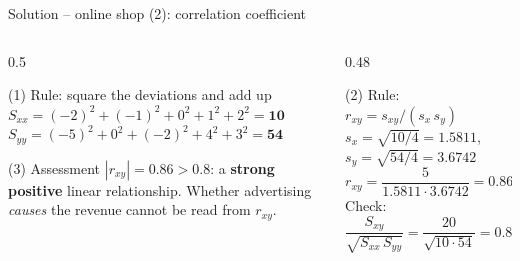 \documentclass[aspectratio=169,11pt]{beamer}
\newcommand{\minlineskip}{%
  \setlength{\lineskiplimit}{2pt}\setlength{\lineskip}{2pt}%
  \setlength{\normallineskiplimit}{2pt}\setlength{\normallineskip}{2pt}}
\begin{document}
\begin{frame}{Solution -- online shop (2): correlation coefficient}
  \begin{columns}[T]
    \begin{column}{0.5\textwidth}
      \small\minlineskip
      \begin{block}{(1) Rule: square the deviations and add up}
        $S_{xx} = (-2)^{2} + (-1)^{2} + 0^{2} + 1^{2} + 2^{2} = \mathbf{10}$\\[4pt]
        $S_{yy} = (-5)^{2} + 0^{2} + (-2)^{2} + 4^{2} + 3^{2} = \mathbf{54}$
      \end{block}
      \begin{exampleblock}{(3) Assessment}
        $|r_{xy}| = 0.86 > 0.8$: a \textbf{strong positive} linear
        relationship. Whether advertising \emph{causes} the revenue cannot be
        read from $r_{xy}$.
      \end{exampleblock}
    \end{column}
    \begin{column}{0.48\textwidth}
      \small\minlineskip
      \begin{block}{(2) Rule: $r_{xy} = s_{xy} / (s_x\,s_y)$}
        $s_x = \sqrt{10/4} = 1.5811$, \quad $s_y = \sqrt{54/4} = 3.6742$\\[3pt]
        $r_{xy} = \dfrac{5}{1.5811 \cdot 3.6742} = \mathbf{0.8607}$\\[3pt]
        Check: $\dfrac{S_{xy}}{\sqrt{S_{xx}\,S_{yy}}} = \dfrac{20}{\sqrt{10 \cdot 54}} = 0.8607$ \checkmark
      \end{block}
    \end{column}
  \end{columns}
\end{frame}
\end{document}
